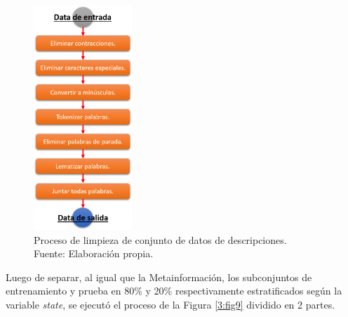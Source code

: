 \begin{figure}[!ht]
	\begin{center}
		\includegraphics[width=0.33\textwidth]{3/figures/description_data_clean.png}
		\caption[Proceso de limpieza de conjunto de datos de descripciones]{Proceso de limpieza de conjunto de datos de descripciones.\\
			Fuente: Elaboración propia.}
		\label{3:fig8}
	\end{center}
\end{figure}

Luego de separar, al igual que la Metainformación, los subconjuntos de entrenamiento y prueba en 80\% y 20\% respectivamente estratificados según la variable \textit{state}, se ejecutó el proceso de la Figura \ref{3:fig9} dividido en 2 partes.


